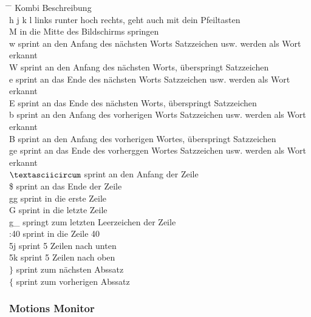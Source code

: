 \documentclass[10pt,a4paper,oneside]{report}
\begin{document}
\begin{tabbing}
  \hspace*{1mm} \=\hspace{30mm} \= \kill
  \> Kombi \> Beschreibung\\
  \> h j k l \> links runter hoch rechts, geht auch mit dein Pfeiltasten\\
  \> M \> in die Mitte des Bildschirms springen\\
  \> w \> sprint an den Anfang des nächsten Worts Satzzeichen usw. werden als Wort erkannt\\
  \> W \> sprint an den Anfang des nächsten Worts, überspringt Satzzeichen\\
  \> e \> sprint an das Ende des nächsten Worts Satzzeichen  usw. werden als Wort erkannt\\
  \> E \> sprint an das Ende des nächsten Worts, überspringt Satzzeichen\\
  \> b \> sprint an den Anfang des vorherigen Worts Satzzeichen  usw. werden als Wort erkannt\\
  \> B \> sprint an den Anfang des vorherigen Wortes, überspringt Satzzeichen\\
  \> ge \> sprint an das Ende des vorherggen Wortes Satzzeichen  usw. werden als Wort erkannt\\
  \> \begin{math} \textasciicircum \end{math}\> sprint an den Anfang der Zeile\\
  \> \$ \> sprint an das Ende der Zeile\\
  \> gg \> sprint in die erste Zeile\\
  \> G \> sprint in die letzte Zeile\\
  \> g\_ \> springt zum letzten Leerzeichen der Zeile\\
  \> :40 \> sprint in die Zeile 40\\
  \> 5j \> sprint 5 Zeilen nach unten\\
  \> 5k \> sprint 5 Zeilen nach oben\\
  \> \begin{math} \rbrace \end{math} \> sprint zum nächsten Abssatz\\
  \> \begin{math} \lbrace \end{math} \> sprint zum vorherigen Abssatz\\
 \end{tabbing}


\subsubsection{Motions Monitor}
\end{document}
